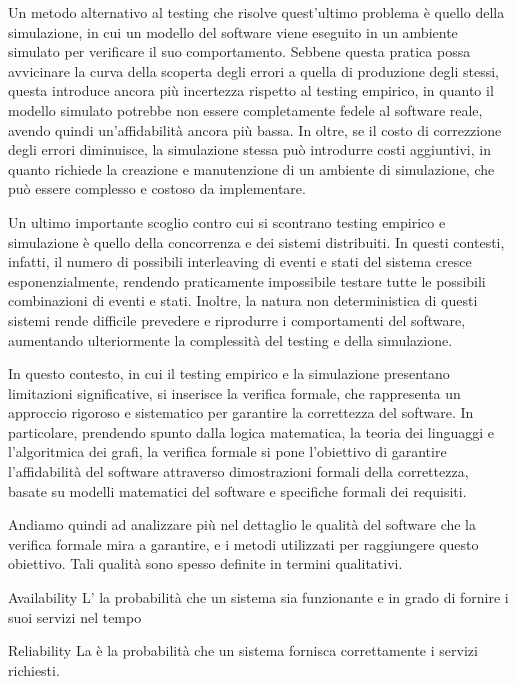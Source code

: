 Un metodo alternativo al testing che risolve quest'ultimo problema è quello della simulazione, in cui un modello del software viene eseguito in un ambiente simulato per verificare il suo comportamento.
Sebbene questa pratica possa avvicinare la curva della scoperta degli errori a quella di produzione degli stessi, questa introduce ancora più incertezza rispetto al testing empirico, in quanto il modello simulato potrebbe non essere completamente fedele al software reale, avendo quindi un'affidabilità ancora più bassa.
In oltre, se il costo di correzzione degli errori diminuisce, la simulazione stessa può introdurre costi aggiuntivi, in quanto richiede la creazione e manutenzione di un ambiente di simulazione, che può essere complesso e costoso da implementare.

Un ultimo importante scoglio contro cui si scontrano testing empirico e simulazione è quello della concorrenza e dei sistemi distribuiti. In questi contesti, infatti, il numero di possibili interleaving di eventi e stati del sistema cresce esponenzialmente, rendendo praticamente impossibile testare tutte le possibili combinazioni di eventi e stati.
Inoltre, la natura non deterministica di questi sistemi rende difficile prevedere e riprodurre i comportamenti del software, aumentando ulteriormente la complessità del testing e della simulazione.

In questo contesto, in cui il testing empirico e la simulazione presentano limitazioni significative, si inserisce la verifica formale, che rappresenta un approccio rigoroso e sistematico per garantire la correttezza del software.
In particolare, prendendo spunto dalla logica matematica, la teoria dei linguaggi e l'algoritmica dei grafi, la verifica formale si pone l'obiettivo di garantire l'affidabilità del software attraverso dimostrazioni formali della correttezza, basate su modelli matematici del software e specifiche formali dei requisiti.

Andiamo quindi ad analizzare più nel dettaglio le qualità del software che la verifica formale mira a garantire, e i metodi utilizzati per raggiungere questo obiettivo. Tali qualità sono spesso definite in termini qualitativi.

\begin{definition}{Availability}
  L' la probabilità che un sistema sia funzionante e in grado di fornire i suoi servizi nel tempo
\end{definition}

\begin{definition}{Reliability}
  La  è la probabilità che un sistema fornisca correttamente i servizi richiesti.
\end{definition}

